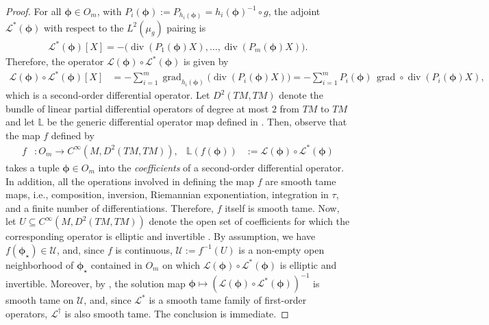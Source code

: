 \documentclass{article}
\theoremstyle{remark}
\newcommand{\M}{M}
\DeclareMathOperator{\grad}{\mathrm{grad}}
\DeclareMathOperator{\Div}{div}
\begin{document}
\begin{proof}
    For all $\bm{\phi}\in O_m$, with $P_i(\bm{\phi}):=P_{h_i(\bm{\phi})}=h_i(\bm{\phi})^{-1}\circ g$, the adjoint $\mathcal{L}^*(\bm{\phi})$ with respect to the $L^{2}(\mu_g)$ pairing is 
%
\begin{align*}
    \mathcal{L}^*(\bm{\phi})[X]= -\bigl(\Div(P_1(\bm{\phi})X),\dots,\Div(P_m(\bm{\phi})X)\bigr).
\end{align*}
%
Therefore, the operator $\mathcal{L}(\bm{\phi})\circ\mathcal{L}^*(\bm{\phi})$ is given by
%
\begin{align*}
    \mathcal{L}(\bm{\phi})\circ\mathcal{L}^*(\bm{\phi})[X] &= -\sum_{i=1}^m \grad_{h_i(\bm{\phi})}\bigl(\Div(P_i(\bm{\phi})X)\bigr)= - \sum_{i=1}^m P_i(\bm{\phi})\,\grad \circ\Div (P_i(\bm{\phi}) X),
\end{align*}
%
which is a second-order differential operator. Let $D^2(T\M,T\M)$ denote the bundle of linear partial differential operators of degree at most $2$ from $T\M$ to $T\M$ and let $\mathbb{L}$ be the generic differential operator map defined in \cite[Part~II, Section 3.3]{Hamilton1982}. Then, observe that the map $f$ defined by
%
\begin{align*}
    f&: O_m\rightarrow C^\infty(\M,D^2(T\M,T\M)), & \mathbb{L}(f(\bm{\phi}))&:=\mathcal{L}(\bm{\phi})\circ\mathcal{L}^*(\bm{\phi})
\end{align*}
%
takes a tuple $\bm{\phi}\in O_m$ into the \emph{coefficients} of a second-order differential operator. In addition, all the operations involved in defining the map $f$ are smooth tame maps, i.e., composition, inversion, Riemannian exponentiation, integration in $\tau$, and a finite number of differentiations. Therefore, $f$ itself is smooth tame. Now, let $U\subseteq C^\infty(\M,D^2(T\M,T\M))$ denote the open set of coefficients for which the corresponding operator is elliptic and invertible \cite[Part~II, Section 3.3]{Hamilton1982}. By assumption, we have $f(\bm{\phi}_\star)\in\mathcal{U}$, and, since $f$ is continuous, $\mathcal{U}:=f^{-1}(U)$ is a non-empty open neighborhood of $\bm{\phi}_\star$ contained in $O_m$ on which $\mathcal{L}(\bm{\phi})\circ\mathcal{L}^*(\bm{\phi})$ is elliptic and invertible. Moreover, by \cite[Part~II, Theorem 3.3.1]{Hamilton1982}, the solution map $\bm{\phi}\mapsto(\mathcal{L}(\bm{\phi})\circ\mathcal{L}^*(\bm{\phi}))^{-1}$ is smooth tame on $\mathcal{U}$, and, since $\mathcal{L}^*$ is a smooth tame family of first-order operators, $\mathcal{L}^\dagger$ is also smooth tame. The conclusion is immediate.
\end{proof}
\end{document}
